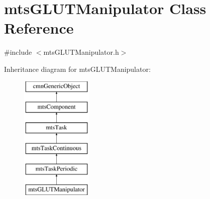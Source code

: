 \hypertarget{classmts_g_l_u_t_manipulator}{}\section{mts\+G\+L\+U\+T\+Manipulator Class Reference}
\label{classmts_g_l_u_t_manipulator}


{\ttfamily \#include $<$mts\+G\+L\+U\+T\+Manipulator.\+h$>$}

Inheritance diagram for mts\+G\+L\+U\+T\+Manipulator\+:\begin{figure}[H]
\begin{center}
\leavevmode
\includegraphics[height=6.000000cm]{d6/d4e/classmts_g_l_u_t_manipulator}
\end{center}
\end{figure}
